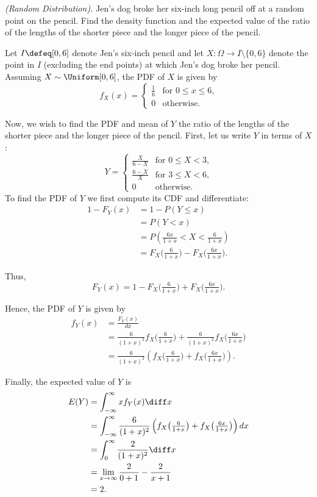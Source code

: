 \begin{problem}[Handout 12, \# 19]
  \emph{(Random Distribution).} Jen's dog broke her six-inch long pencil
  off at a random point on the pencil. Find the density function and the
  expected value of the ratio of the lengths of the shorter piece and the
  longer piece of the pencil.
\end{problem}
\begin{solution}
  Let \(I\defeq[0,6]\) denote Jen's six-inch pencil and let
  \(X\colon\Omega\to I\setminus\{0,6\}\) denote the point in \(I\)
  (excluding the end points) at which Jen's dog broke her pencil. Assuming
  \(X\sim\Uniform[0,6]\), the PDF of \(X\) is given by
  \[
    f_X(x)=
    \begin{cases}
      \frac{1}{6}&\text{for \(0\leq x\leq 6\),}\\
      0&\text{otherwise.}
    \end{cases}
  \]

  Now, we wish to find the PDF and mean of \(Y\) the ratio of the lengths
  of the shorter piece and the longer piece of the pencil. First, let us
  write \(Y\) in terms of \(X\):
  \[
    Y=
    \begin{cases}
      \frac{X}{6-X}&\text{for \(0\leq X<3\),}\\
      \frac{6-X}{X}&\text{for \(3\leq X<6\),}\\
      0&\text{otherwise.}
    \end{cases}
  \]
  To find the PDF of \(Y\) we first compute its CDF and differentiate:
  \begin{align*}
    1-F_Y(x)
    &=1-P(Y\leq x)\\
    &=P(Y<x)\\
    &=P\left(\frac{6x}{1+x}<X<\frac{6}{1+x}\right)\\
    &=F_X\bigl(\tfrac{6}{1+x}\bigr)-F_X\bigl(\tfrac{6x}{1+x}\bigr).
  \end{align*}

  Thus,
  \[
    F_Y(x)=1-F_X\bigl(\tfrac{6}{1+x}\bigr)+F_X\bigl(\tfrac{6x}{1+x}\bigr).
  \]

  Hence, the PDF of \(Y\) is given by
  \begin{align*}
    f_Y(x)
    &=\frac{F_Y(x)}{dx}\\
    &=\frac{6}{(1+x)^2}f_X\bigl(\tfrac{6}{1+x}\bigr)
      +\frac{6}{(1+x)^2}f_X\bigl(\tfrac{6x}{1+x}\bigr)\\
    &=\frac{6}{(1+x)^2}\left(
      f_X\bigl(\tfrac{6}{1+x}\bigr)
      +f_X\bigl(\tfrac{6x}{1+x}\bigr)
      \right).
  \end{align*}

  Finally, the expected value of \(Y\) is
  \begin{align*}
    E(Y)
    &=\int_{-\infty}^\infty xf_Y(x)\diff x\\
    &=\int_{-\infty}^\infty
      \frac{6}{(1+x)^2}\left(
      f_X\bigl(\tfrac{6}{1+x}\bigr)
      +f_X\bigl(\tfrac{6x}{1+x}\bigr)
      \right)dx\\
    &=\int_0^\infty\frac{2}{(1+x)^2}\diff x\\
    &=\lim_{x\to\infty}\frac{2}{0+1}-\frac{2}{x+1}\\
    &=2.
  \end{align*}
\end{solution}
